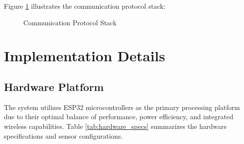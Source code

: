 \documentclass[conference]{IEEEtran}
\begin{document}
Figure \ref{fig:protocol_stack} illustrates the communication protocol stack:

\begin{figure}[htbp]
\centering
{}
\caption{Communication Protocol Stack}
\label{fig:protocol_stack}
\end{figure}

\section{Implementation Details}

\subsection{Hardware Platform}

The system utilizes ESP32 microcontrollers as the primary processing platform due to their optimal balance of performance, power efficiency, and integrated wireless capabilities. Table \ref{tab:hardware_specs} summarizes the hardware specifications and sensor configurations.
\end{document}
